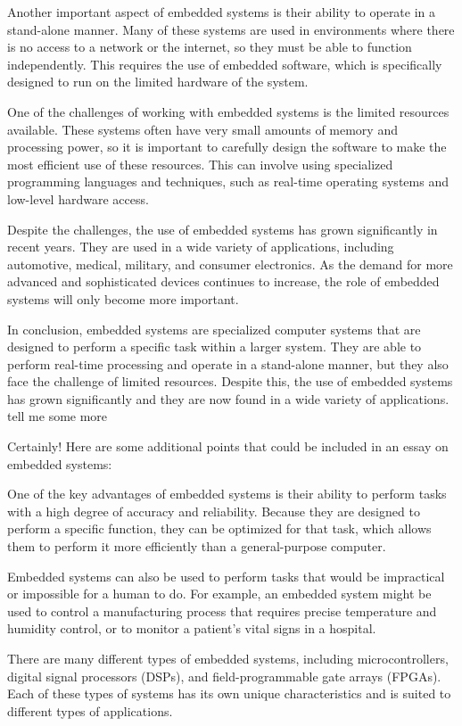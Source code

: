 Another important aspect of embedded systems is their ability to operate in a stand-alone manner. Many of these systems are used in environments where there is no access to a network or the internet, so they must be able to function independently. This requires the use of embedded software, which is specifically designed to run on the limited hardware of the system.

One of the challenges of working with embedded systems is the limited resources available. These systems often have very small amounts of memory and processing power, so it is important to carefully design the software to make the most efficient use of these resources. This can involve using specialized programming languages and techniques, such as real-time operating systems and low-level hardware access.

Despite the challenges, the use of embedded systems has grown significantly in recent years. They are used in a wide variety of applications, including automotive, medical, military, and consumer electronics. As the demand for more advanced and sophisticated devices continues to increase, the role of embedded systems will only become more important.

In conclusion, embedded systems are specialized computer systems that are designed to perform a specific task within a larger system. They are able to perform real-time processing and operate in a stand-alone manner, but they also face the challenge of limited resources. Despite this, the use of embedded systems has grown significantly and they are now found in a wide variety of applications.
tell me some more

Certainly! Here are some additional points that could be included in an essay on embedded systems:

    One of the key advantages of embedded systems is their ability to perform tasks with a high degree of accuracy and reliability. Because they are designed to perform a specific function, they can be optimized for that task, which allows them to perform it more efficiently than a general-purpose computer.

    Embedded systems can also be used to perform tasks that would be impractical or impossible for a human to do. For example, an embedded system might be used to control a manufacturing process that requires precise temperature and humidity control, or to monitor a patient's vital signs in a hospital.

    There are many different types of embedded systems, including microcontrollers, digital signal processors (DSPs), and field-programmable gate arrays (FPGAs). Each of these types of systems has its own unique characteristics and is suited to different types of applications.

